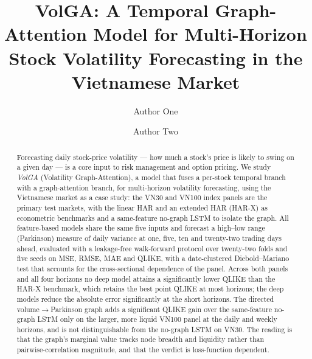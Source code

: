 \documentclass[runningheads]{llncs}
\begin{document}
\title{VolGA: A Temporal Graph-Attention Model for Multi-Horizon Stock Volatility Forecasting in the Vietnamese Market}

\author{Author One \and Author Two}

\maketitle

\begin{abstract}
Forecasting daily stock-price volatility --- how much a stock's price is likely to swing on a given
day --- is a core input to risk management and option pricing. We study \emph{VolGA}
(Volatility Graph-Attention), a model that fuses a per-stock temporal branch with a
graph-attention branch, for multi-horizon volatility forecasting, using the Vietnamese market
as a case study: the VN30 and VN100 index panels are the primary test markets, with the linear
HAR and an extended HAR (HAR-X) as econometric benchmarks and a same-feature no-graph LSTM
to isolate the graph. All feature-based models share the same five inputs and forecast a
high--low range (Parkinson) measure of daily variance at one, five, ten and twenty-two trading
days ahead, evaluated with a leakage-free walk-forward protocol over twenty-two folds and five
seeds on MSE, RMSE, MAE and QLIKE, with a date-clustered Diebold--Mariano test that accounts for
the cross-sectional dependence of the panel. Across both panels and all four horizons no deep
model attains a significantly lower QLIKE than the HAR-X benchmark, which retains the best point
QLIKE at most horizons; the deep models reduce the absolute error significantly at the short
horizons. The directed volume$\to$Parkinson graph adds a significant QLIKE gain over the
same-feature no-graph LSTM only on the larger, more liquid VN100 panel at the daily and weekly
horizons, and is not distinguishable from the no-graph LSTM on VN30. The reading is that the
graph's marginal value tracks node breadth and liquidity rather than pairwise-correlation
magnitude, and that the verdict is loss-function dependent.
\end{abstract}
\end{document}
